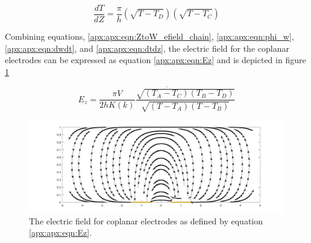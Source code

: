  \begin{equation}
     \frac{dT}{dZ} = \frac{\pi}{h}(\sqrt{T-T_D})(\sqrt{T-T_C})
     \label{apx:apx:eqn:dtdz}
 \end{equation}
 
 \par Combining equations, \ref{apx:apx:eqn:ZtoW_efield_chain}, \ref{apx:apx:eqn:phi_w}, \ref{apx:apx:eqn:dwdt}, and \ref{apx:apx:eqn:dtdz}, the electric field for the coplanar electrodes can be expressed as equation \ref{apx:apx:eqn:Ez} and is depicted in figure \ref{apx:apx:fig:Ez}
 
 \begin{equation}
    E_z = \overline{\frac{\pi V}{2hK(k)} \frac{\sqrt{(T_A-T_C)(T_B-T_D)}}{\sqrt{(T-T_A)(T-T_B)}}}
    \label{apx:apx:eqn:Ez}
 \end{equation}
 
 
     \begin{figure}[h]
        \centering
        \includegraphics[width=\textwidth]{images/Ez.png}
        \caption[Electric Field for Coplanar Electrodes]{The electric field for coplanar electrodes as defined by equation \ref{apx:apx:eqn:Ez}.}
        \label{apx:apx:fig:Ez}
    \end{figure}